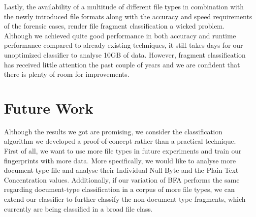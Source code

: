Lastly, the availability of a multitude of different file types in combination with the newly introduced file formats along with the accuracy and speed requirements of the forensic cases, render file fragment classification a wicked problem. Although we achieved quite good performance in both accuracy and runtime performance compared to already existing techniques, it still takes days for our unoptimized classifier to analyse 10GB of data. However, fragment classification has received little attention the past couple of years and we are confident that there is plenty of room for improvements. 


\section{Future Work}
Although the results we got are promising, we consider the classification algorithm we developed a proof-of-concept rather than a practical technique. First of all, we want to use more file types in future experiments and train our fingerprints with more data. More specifically, we would like to analyse more document-type file and analyse their Individual Null Byte and the Plain Text Concentration values. Additionally, if our variation of BFA performs the same regarding document-type classification in a corpus of more file types, we can extend our classifier to further classify the non-document type fragments, which currently are being classified in a broad file class.

